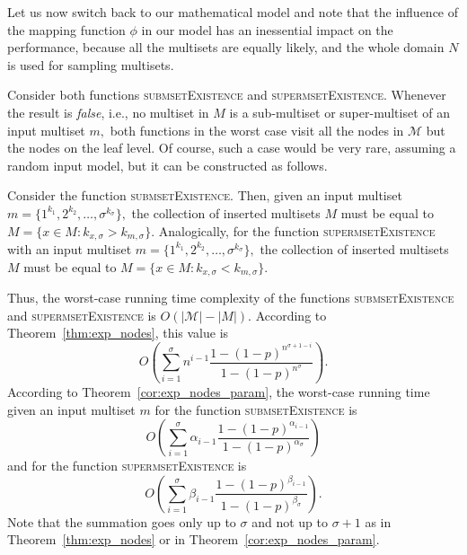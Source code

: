 \documentclass[algorithms,article,accept,pdftex,moreauthors]{Definitions/mdpi}
\begin{document}
Let us now switch back to our mathematical model and note that the influence 
of the mapping function $\phi$ in our model has an inessential impact on the performance, 
because all the multisets are equally likely, and the whole domain $N$ is used for 
sampling multisets. 

Consider both functions \textsc{submsetExistence} and \textsc{supermsetExistence}. 
Whenever the result is \emph{false}, i.e., no multiset in $M$ is 
a sub-multiset or super-multiset of an input multiset $m,$ both functions in the 
worst case visit all the nodes in $\mathcal{M}$ but the nodes on the leaf level. 
Of course, such a case would be very rare, assuming a random input model, but 
it can be constructed as follows. 

Consider the function \textsc{submsetExistence}. Then, given an input multiset 
$m = \{ 1^{k_1}, 2^{k_2}, \ldots, \sigma^{k_\sigma} \},$ the collection of inserted 
multisets $M$ must be equal to $M = \{ x\in M : k_{x,\sigma} > k_{m,\sigma} \}.$ 
Analogically, for the function \textsc{supermsetExistence} with an input multiset 
$m = \{ 1^{k_1}, 2^{k_2}, \ldots, \sigma^{k_\sigma} \},$ the collection of inserted 
multisets $M$ must be equal to $M = \{ x\in M : k_{x,\sigma} < k_{m,\sigma} \}.$ 

Thus, the worst-case running time complexity of the functions 
\textsc{submsetExistence} and \textsc{supermsetExistence} is $O(|\mathcal{M}| - |M|).$ 
According to Theorem~\ref{thm:exp_nodes}, this value is 
\begin{equation*}
O(\sum_{i=1}^{\sigma} n^{i-1} \frac{1-(1-p)^{n^{\sigma +1 -i}}}{1-(1-p)^{n^{\sigma}}}).
\end{equation*}
According to Theorem~\ref{cor:exp_nodes_param}, the worst-case running 
time given an input multiset $m$ for the function \textsc{submsetExistence} is 
\begin{equation*}
O(\sum_{i=1}^{\sigma} \alpha_{i-1} \frac{1-(1-p)^{\alpha_{i-1}}}{1-(1-p)^{\alpha_{\sigma}}})
\end{equation*}
and for the function \textsc{supermsetExistence} is 
\begin{equation*}
O(\sum_{i=1}^{\sigma} \beta_{i-1} \frac{1-(1-p)^{\beta_{i-1}}}{1-(1-p)^{\beta_{\sigma}}}).
\end{equation*}
Note that the summation goes only up to $\sigma$ and not up to $\sigma + 1$ as 
in Theorem~\ref{thm:exp_nodes} or in Theorem~\ref{cor:exp_nodes_param}.
\end{document}
